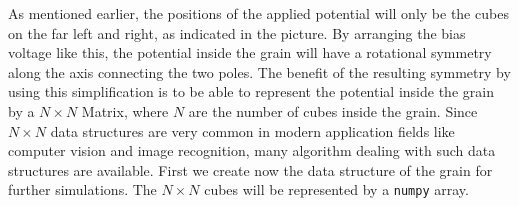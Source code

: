 \documentclass[11pt]{article}
\begin{document}
    As mentioned earlier, the positions of the applied potential will only
be the cubes on the far left and right, as indicated in the picture. By
arranging the bias voltage like this, the potential inside the grain
will have a rotational symmetry along the axis connecting the two poles.
The benefit of the resulting symmetry by using this simplification is to
be able to represent the potential inside the grain by a \(N\times N\)
Matrix, where \(N\) are the number of cubes inside the grain. Since
\(N\times N\) data structures are very common in modern application
fields like computer vision and image recognition, many algorithm
dealing with such data structures are available. First we create now the
data structure of the grain for further simulations. The \(N\times N\)
cubes will be represented by a \texttt{numpy} array.
\end{document}
